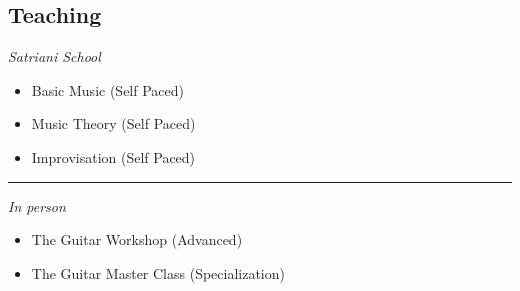 \documentclass[12pt]{../templates/classes/res}
\begin{document}
\begin{resume}
\begin{minipage}[t]{0.35\linewidth}
  \section{Teaching}
  \vspace{10pt}
  \footnotesize{
\begin{minipage}[t]{1.0\linewidth}
  \vspace{1pt}
  \raggedright{\emph{Satriani School}}
\end{minipage}
\begin{minipage}[t]{1.0\linewidth}
  \begin{flushleft}
  \vspace{2pt}
    \begin{itemize}
      \item Basic Music (Self Paced)
\item Music Theory (Self Paced)
\item Improvisation (Self Paced)

    \end{itemize}
  \end{flushleft}
  \vspace{-8pt}
\end{minipage}
\rule{1.0\textwidth}{0.1pt}
\begin{minipage}[t]{1.0\linewidth}
  \vspace{1pt}
  \raggedright{\emph{In person}}
\end{minipage}
\begin{minipage}[t]{1.0\linewidth}
  \begin{flushleft}
  \vspace{2pt}
    \begin{itemize}
      \item The Guitar Workshop (Advanced)
\item The Guitar Master Class (Specialization)

    \end{itemize}
  \end{flushleft}
  \vspace{-8pt}
\end{minipage}
}
\end{minipage}
\hfill
\begin{minipage}[t]{0.35\linewidth}

\end{minipage}
\end{resume}
\end{document}
